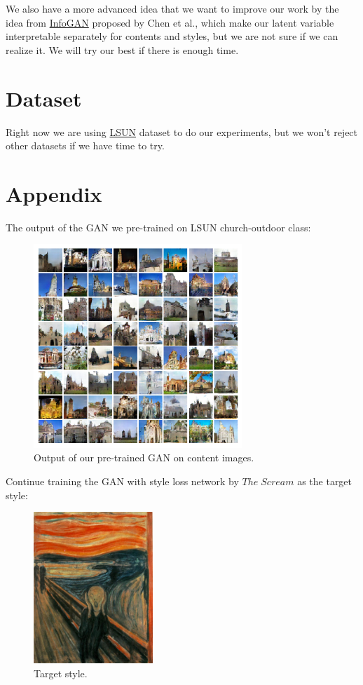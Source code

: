 \documentclass{article}
\begin{document}
We also have a more advanced idea that we want to improve our work by the idea from \href{https://arxiv.org/pdf/1606.03657.pdf}{InfoGAN} proposed by Chen et al., which make our latent variable interpretable separately for contents and styles, but we are not sure if we can realize it. We will try our best if there is enough time.

\section{Dataset}

Right now we are using \href{http://lsun.cs.princeton.edu/2017/}{LSUN} dataset to do our experiments, but we won't reject other datasets if we have time to try.

\newpage
\section*{Appendix}
\label{ap}

The output of the GAN we pre-trained on LSUN church-outdoor class:

\begin{figure}[!h]
\centering
\includegraphics[width=0.7\textwidth]{../images/pretrained_gan_output.png}
\caption{Output of our pre-trained GAN on content images.}
\label{f1}
\end{figure}

Continue training the GAN with style loss network by $The\;Scream$ as the target style:

\begin{figure}[!h]
\centering
\includegraphics[width=0.4\textwidth]{../images/the_scream.jpg}
\caption{Target style.}
\label{f2}
\end{figure}
\end{document}
